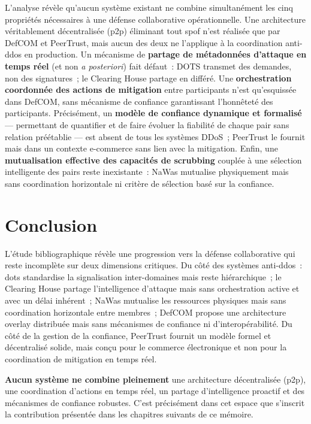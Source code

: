 L'analyse révèle qu'aucun système existant ne combine simultanément les cinq propriétés nécessaires à une défense collaborative opérationnelle. Une architecture véritablement décentralisée (\gls{p2p}) éliminant tout \gls{spof} n'est réalisée que par DefCOM et PeerTrust, mais aucun des deux ne l'applique à la coordination anti-\gls{ddos} en production. Un mécanisme de \textbf{partage de métadonnées d'attaque en temps réel} (et non \textit{a posteriori}) fait défaut~: DOTS transmet des demandes, non des signatures~; le Clearing House partage en différé. Une \textbf{orchestration coordonnée des actions de mitigation} entre participants n'est qu'esquissée dans DefCOM, sans mécanisme de confiance garantissant l'honnêteté des participants. Précisément, un \textbf{modèle de confiance dynamique et formalisé} — permettant de quantifier et de faire évoluer la fiabilité de chaque pair sans relation préétablie — est absent de tous les systèmes DDoS~; PeerTrust le fournit mais dans un contexte e-commerce sans lien avec la mitigation. Enfin, une \textbf{mutualisation effective des capacités de scrubbing} couplée à une sélection intelligente des pairs reste inexistante~: NaWas mutualise physiquement mais sans coordination horizontale ni critère de sélection basé sur la confiance.

\section{Conclusion}

L'étude bibliographique révèle une progression vers la défense collaborative qui reste incomplète sur deux dimensions critiques. Du côté des systèmes anti-\gls{ddos}~: \gls{dots} standardise la signalisation inter-domaines mais reste hiérarchique~; le Clearing House partage l'intelligence d'attaque mais sans orchestration active et avec un délai inhérent~; NaWas mutualise les ressources physiques mais sans coordination horizontale entre membres~; DefCOM propose une architecture overlay distribuée mais sans mécanismes de confiance ni d'interopérabilité. Du côté de la gestion de la confiance, PeerTrust fournit un modèle formel et décentralisé solide, mais conçu pour le commerce électronique et non pour la coordination de mitigation en temps réel.

\textbf{Aucun système ne combine pleinement} une architecture décentralisée (\gls{p2p}), une coordination d'actions en temps réel, un partage d'intelligence proactif et des mécanismes de confiance robustes. C'est précisément dans cet espace que s'inscrit la contribution présentée dans les chapitres suivants de ce mémoire.
